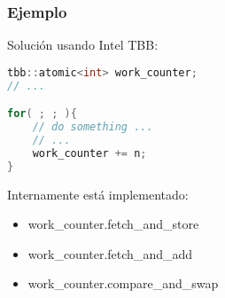 \documentclass[10pt]{beamer}
\begin{document}
\begin{frame}[fragile] %
  \frametitle{Ejemplo}
  \alert{Solución} usando Intel TBB:

  \begin{lstlisting}[language=C++, frame=single]
tbb::atomic<int> work_counter;
// ...

for( ; ; ){
    // do something ...
    // ...
    work_counter += n;
}
  \end{lstlisting}
  Internamente está implementado:
  \begin{itemize}
  \item work\_counter.fetch\_and\_store
  \item work\_counter.fetch\_and\_add
  \item work\_counter.compare\_and\_swap
  \end{itemize}
\end{frame}
\end{document}
